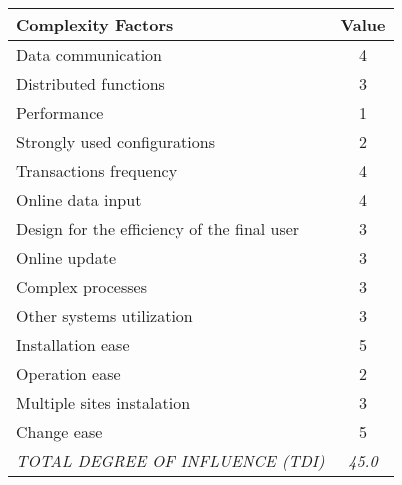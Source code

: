 
\begin{tabular}{l|c}
\textbf{Complexity Factors} & \textbf{Value} \\ \hline
Data communication & 4 \\
Distributed functions & 3 \\
Performance & 1 \\
Strongly used configurations & 2 \\
Transactions frequency & 4 \\
Online data input & 4 \\
Design for the efficiency of the final user & 3 \\
Online update & 3 \\
Complex processes & 3 \\
Other systems utilization & 3 \\
Installation ease & 5 \\
Operation ease & 2 \\
Multiple sites instalation & 3 \\
Change ease & 5 \\ \hline
\textit{TOTAL DEGREE OF INFLUENCE (TDI)} & \textit{45.0}
\end{tabular}